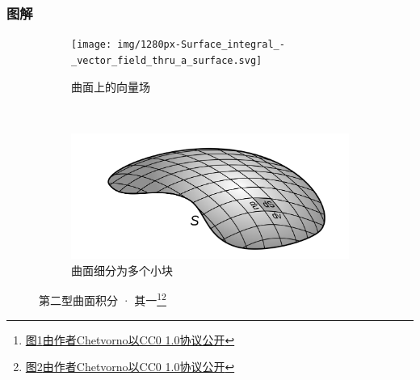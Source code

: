 \documentclass[xetex]{beamer}
\begin{document}
    \begin{frame}
        \frametitle{图解}
    
        \begin{figure}[ht]
            \centering
            \begin{subfigure}[b]{.4\textwidth}
                \texttt{[image: img/1280px-Surface\_integral\_-\_vector\_field\_thru\_a\_surface.svg]}
                \caption{曲面上的向量场}
                \label{fig:intplate-1a}
            \end{subfigure}
            ~
            \begin{subfigure}[b]{.4\textwidth}
                \includegraphics[width=\textwidth]{img/1280px-Surface_integral_-_parametrized_surface.svg.png}
                \caption{曲面细分为多个小块}
                \label{fig:intplate-1b}
            \end{subfigure}
            \caption{第二型曲面积分 · 其一\footnote[1]{\href{https://commons.wikimedia.org/wiki/File:Surface_integral_-_vector_field_thru_a_surface.svg}{图\ref{fig:intplate-1a}由作者Chetvorno以CC0 1.0协议公开}}\footnote[2]{\href{https://commons.wikimedia.org/wiki/File:Surface_integral_-_parametrized_surface.svg}{图\ref{fig:intplate-1b}由作者Chetvorno以CC0 1.0协议公开}}}
            \label{fig:intplate-1}
        \end{figure}
    
    \end{frame}
\end{document}
